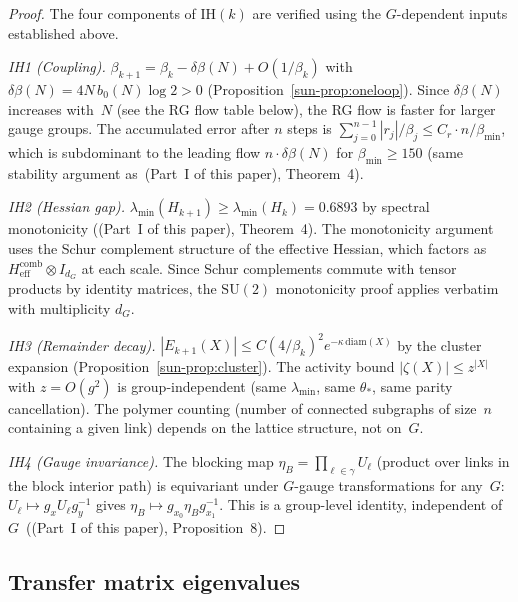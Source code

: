 \documentclass[11pt]{article}
\theoremstyle{definition}
\newcommand{\SU}{\mathrm{SU}}
\newcommand{\diam}{\mathrm{diam}}
\begin{document}
\begin{proof}
The four components of IH$(k)$ are verified using
the $G$-dependent inputs established above.

\emph{IH1 (Coupling).}
$\beta_{k+1}=\beta_k-\delta\beta(N)+O(1/\beta_k)$
with $\delta\beta(N)=4N\,b_0(N)\log 2>0$
(Proposition~\ref{sun-prop:oneloop}).
Since $\delta\beta(N)$ increases with~$N$
(see the RG flow table below), the RG flow is faster for
larger gauge groups.  The accumulated error after $n$
steps is $\sum_{j=0}^{n-1}|r_j|/\beta_j\le
C_r\cdot n/\beta_{\min}$, which is subdominant
to the leading flow $n\cdot\delta\beta(N)$ for
$\beta_{\min}\ge 150$ (same stability argument
as~(Part~I of this paper), Theorem~4).

\emph{IH2 (Hessian gap).}
$\lambda_{\min}(H_{k+1})\ge\lambda_{\min}(H_k)=0.6893$
by spectral monotonicity ((Part~I of this paper), Theorem~4).
The monotonicity argument uses the Schur complement
structure of the effective Hessian, which factors as
$H_{\mathrm{eff}}^{\mathrm{comb}}\otimes I_{d_G}$
at each scale.  Since Schur complements commute
with tensor products by identity matrices, the
$\SU(2)$ monotonicity proof applies verbatim
with multiplicity $d_G$.

\emph{IH3 (Remainder decay).}
$|E_{k+1}(X)|\le C(4/\beta_k)^2 e^{-\kappa\,\diam(X)}$
by the cluster expansion
(Proposition~\ref{sun-prop:cluster}).
The activity bound $|\zeta(X)|\le z^{|X|}$ with
$z=O(g^2)$ is group-independent (same $\lambda_{\min}$,
same $\theta_*$, same parity cancellation).
The polymer counting (number of connected subgraphs of
size~$n$ containing a given link) depends on the lattice
structure, not on~$G$.

\emph{IH4 (Gauge invariance).}
The blocking map $\eta_B=\prod_{\ell\in\gamma}U_\ell$
(product over links in the block interior path) is
equivariant under $G$-gauge transformations for
any~$G$: $U_\ell\mapsto g_x U_\ell g_y^{-1}$ gives
$\eta_B\mapsto g_{x_0}\eta_B g_{x_1}^{-1}$.
This is a group-level identity, independent
of~$G$~((Part~I of this paper), Proposition~8).
\end{proof}



\subsection{Transfer matrix eigenvalues}
\end{document}
